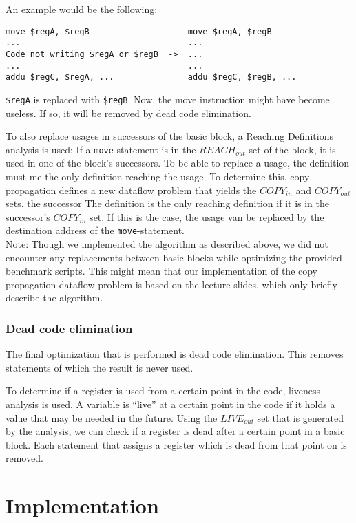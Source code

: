 \documentclass[10pt,a4paper]{article}
\begin{document}
An example would be the following:
\begin{verbatim}
move $regA, $regB                    move $regA, $regB
...                                  ...
Code not writing $regA or $regB  ->  ...
...                                  ...
addu $regC, $regA, ...               addu $regC, $regB, ...
\end{verbatim}
\texttt{\$regA} is replaced with \texttt{\$regB}. Now, the move instruction
might have become useless. If so, it will be removed by dead code elimination.

To also replace usages in successors of the basic block, a Reaching Definitions
analysis is used: If a \texttt{move}-statement is in the $REACH_{out}$ set of
the block, it is used in one of the block's successors. To be able to replace a
usage, the definition must me the only definition reaching the usage. To
determine this, copy propagation defines a new dataflow problem that yields the
$COPY_{in}$ and $COPY_{out}$ sets. the successor The definition is the only
reaching definition if it is in the successor's $COPY_{in}$ set. If this is the
case, the usage van be replaced by the destination address of the
\texttt{move}-statement. \\
Note: Though we implemented the algorithm as described above, we did not
encounter any replacements between basic blocks while optimizing the provided
benchmark scripts. This might mean that our implementation of the copy
propagation dataflow problem is based on the lecture slides, which only briefly
describe the algorithm.

\subsubsection{Dead code elimination}

The final optimization that is performed is dead code elimination. This removes
statements of which the result is never used.

To determine if a register is used from a certain point in the code, liveness
analysis is used. A variable is ``live'' at a certain point in the code if it
holds a value that may be needed in the future. Using the $LIVE_{out}$ set
that is generated by the analysis, we can check if a register is dead after a
certain point in a basic block. Each statement that assigns a register which
is dead from that point on is removed.

\section{Implementation}
\end{document}
